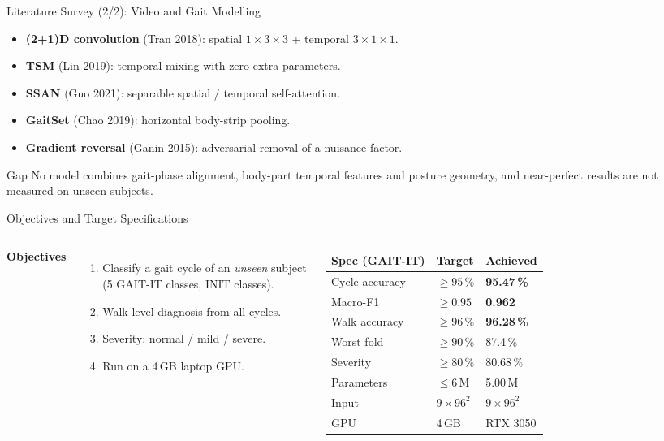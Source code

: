 \documentclass[aspectratio=169,10pt]{beamer}
\begin{document}
\begin{frame}{Literature Survey (2/2): Video and Gait Modelling}
\begin{itemize}
\item \textbf{(2+1)D convolution} (Tran 2018): spatial $1{\times}3{\times}3$ +
temporal $3{\times}1{\times}1$.
\item \textbf{TSM} (Lin 2019): temporal mixing with zero extra parameters.
\item \textbf{SSAN} (Guo 2021): separable spatial / temporal self-attention.
\item \textbf{GaitSet} (Chao 2019): horizontal body-strip pooling.
\item \textbf{Gradient reversal} (Ganin 2015): adversarial removal of a nuisance
factor.
\end{itemize}
\begin{alertblock}{Gap}
No model combines gait-phase alignment, body-part temporal features and posture
geometry, and near-perfect results are not measured on unseen subjects.
\end{alertblock}
\end{frame}

\begin{frame}{Objectives and Target Specifications}
\begin{columns}[T]
\textbf{Objectives}
\begin{enumerate}\small
\item Classify a gait cycle of an \emph{unseen} subject (5 GAIT-IT classes,
INIT classes).
\item Walk-level diagnosis from all cycles.
\item Severity: normal / mild / severe.
\item Run on a 4\,GB laptop GPU.
\end{enumerate}
\small
\begin{tabular}{@{}lll@{}}
\toprule
Spec (GAIT-IT) & Target & Achieved \\
\midrule
Cycle accuracy & $\geq95\,\%$ & \textbf{95.47\,\%} \\
Macro-F1 & $\geq0.95$ & \textbf{0.962} \\
Walk accuracy & $\geq96\,\%$ & \textbf{96.28\,\%} \\
Worst fold & $\geq90\,\%$ & 87.4\,\% \\
Severity & $\geq80\,\%$ & 80.68\,\% \\
Parameters & $\leq6$\,M & 5.00\,M \\
Input & $9{\times}96^2$ & $9{\times}96^2$ \\
GPU & 4\,GB & RTX 3050 \\
\bottomrule
\end{tabular}
\end{columns}
\end{frame}
\end{document}
